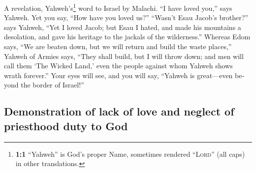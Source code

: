 \begin{paracol}{2}
\begin{otherlanguage}{english}
 A revelation, Yahweh's\footnote{\textbf{1:1} ``Yahweh''
  is God's proper Name, sometimes rendered ``\textsc{Lord}'' (all caps)
  in other translations.} word to Israel by Malachi.  ``I
have loved you,'' says Yahweh. Yet you say, ``How have you loved us?''
``Wasn't Esau Jacob's brother?'' says Yahweh, ``Yet I loved Jacob;
 but Esau I hated, and made his mountains a desolation,
and gave his heritage to the jackals of the wilderness.'' 
Whereas Edom says, ``We are beaten down, but we will return and build
the waste places,'' Yahweh of Armies says, ``They shall build, but I
will throw down; and men will call them `The Wicked Land,' even the
people against whom Yahweh shows wrath forever.''  Your
eyes will see, and you will say, ``Yahweh is great---even beyond the
border of Israel!''

\hypertarget{demonstration-of-lack-of-love-and-neglect-of-priesthood-duty-to-god}{%
\subsection{Demonstration of lack of love and neglect of priesthood duty
to
God}\label{demonstration-of-lack-of-love-and-neglect-of-priesthood-duty-to-god}}


\end{otherlanguage}
\end{paracol}
